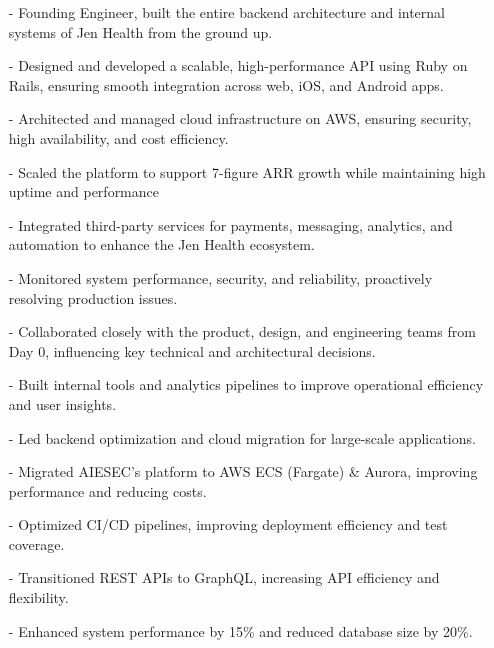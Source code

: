 \documentclass[10pt,a4paper,ragged2e,withhyper]{altacv}
\begin{document}
\begin{paracol}{2}
\begin{itemize}
    \item[-] Founding Engineer, built the entire backend architecture and internal systems of Jen Health from the ground up.
    \item[-] Designed and developed a scalable, high-performance API using Ruby on Rails, ensuring smooth integration across web, iOS, and Android apps.
    \item[-] Architected and managed cloud infrastructure on AWS, ensuring security, high availability, and cost efficiency.
    \item[-] Scaled the platform to support 7-figure ARR growth while maintaining high uptime and performance
    \item[-] Integrated third-party services for payments, messaging, analytics, and automation to enhance the Jen Health ecosystem.
    \item[-] Monitored system performance, security, and reliability, proactively resolving production issues.
    \item[-] Collaborated closely with the product, design, and engineering teams from Day 0, influencing key technical and architectural decisions.
    \item[-] Built internal tools and analytics pipelines to improve operational efficiency and user insights.
\end{itemize}

\break

\begin{itemize}
    \item[-] Led backend optimization and cloud migration for large-scale applications.
    \item[-] Migrated AIESEC’s platform to AWS ECS (Fargate) \& Aurora, improving performance and reducing costs.
    \item[-] Optimized CI/CD pipelines, improving deployment efficiency and test coverage.
    \item[-] Transitioned REST APIs to GraphQL, increasing API efficiency and flexibility.
    \item[-] Enhanced system performance by 15\% and reduced database size by 20\%.
\end{itemize}


\end{paracol}
\end{document}
